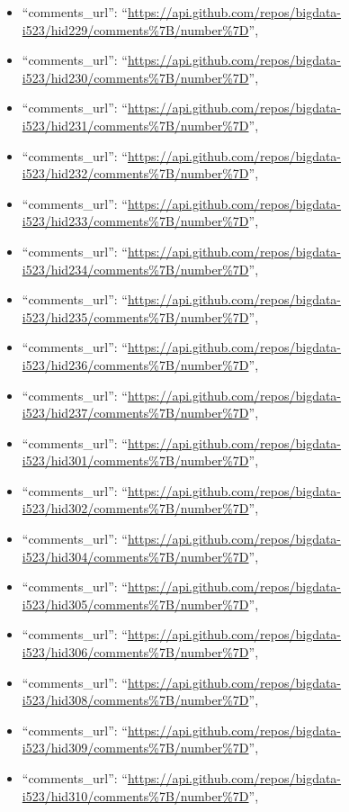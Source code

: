 \begin{itemize}
\item
  ``comments\_url'':
  ``\url{https://api.github.com/repos/bigdata-i523/hid229/comments\%7B/number\%7D}'',
\item
  ``comments\_url'':
  ``\url{https://api.github.com/repos/bigdata-i523/hid230/comments\%7B/number\%7D}'',
\item
  ``comments\_url'':
  ``\url{https://api.github.com/repos/bigdata-i523/hid231/comments\%7B/number\%7D}'',
\item
  ``comments\_url'':
  ``\url{https://api.github.com/repos/bigdata-i523/hid232/comments\%7B/number\%7D}'',
\item
  ``comments\_url'':
  ``\url{https://api.github.com/repos/bigdata-i523/hid233/comments\%7B/number\%7D}'',
\item
  ``comments\_url'':
  ``\url{https://api.github.com/repos/bigdata-i523/hid234/comments\%7B/number\%7D}'',
\item
  ``comments\_url'':
  ``\url{https://api.github.com/repos/bigdata-i523/hid235/comments\%7B/number\%7D}'',
\item
  ``comments\_url'':
  ``\url{https://api.github.com/repos/bigdata-i523/hid236/comments\%7B/number\%7D}'',
\item
  ``comments\_url'':
  ``\url{https://api.github.com/repos/bigdata-i523/hid237/comments\%7B/number\%7D}'',
\item
  ``comments\_url'':
  ``\url{https://api.github.com/repos/bigdata-i523/hid301/comments\%7B/number\%7D}'',
\item
  ``comments\_url'':
  ``\url{https://api.github.com/repos/bigdata-i523/hid302/comments\%7B/number\%7D}'',
\item
  ``comments\_url'':
  ``\url{https://api.github.com/repos/bigdata-i523/hid304/comments\%7B/number\%7D}'',
\item
  ``comments\_url'':
  ``\url{https://api.github.com/repos/bigdata-i523/hid305/comments\%7B/number\%7D}'',
\item
  ``comments\_url'':
  ``\url{https://api.github.com/repos/bigdata-i523/hid306/comments\%7B/number\%7D}'',
\item
  ``comments\_url'':
  ``\url{https://api.github.com/repos/bigdata-i523/hid308/comments\%7B/number\%7D}'',
\item
  ``comments\_url'':
  ``\url{https://api.github.com/repos/bigdata-i523/hid309/comments\%7B/number\%7D}'',
\item
  ``comments\_url'':
  ``\url{https://api.github.com/repos/bigdata-i523/hid310/comments\%7B/number\%7D}'',

\end{itemize}
